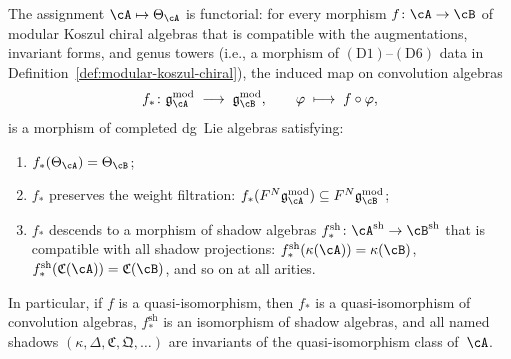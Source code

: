 \begin{proposition}
\label{prop:mc2-functoriality}
The assignment $\cA \mapsto \Theta_\cA$ is functorial:
for every morphism $f\colon \cA \to \cB$ of modular Koszul
chiral algebras that is compatible with the augmentations,
invariant forms, and genus towers
\textup{(}i.e., a morphism of
$(\mathrm{D1})$--$(\mathrm{D6})$ data in
Definition~\textup{\ref{def:modular-koszul-chiral})}, the
induced map on convolution algebras
\begin{equation}\label{eq:mc2-functoriality}
f_*\colon
\mathfrak{g}_\cA^{\mathrm{mod}}
\;\longrightarrow\;
\mathfrak{g}_\cB^{\mathrm{mod}},
\qquad
\varphi \;\longmapsto\; f \circ \varphi,
\end{equation}
is a morphism of completed dg~Lie algebras satisfying:
\begin{enumerate}[label=\textup{(\roman*)}]
\item $f_*(\Theta_\cA) = \Theta_\cB$;
\item $f_*$ preserves the weight filtration:
  $f_*(F^N\mathfrak{g}_\cA^{\mathrm{mod}})
  \subseteq F^N\mathfrak{g}_\cB^{\mathrm{mod}}$;
\item $f_*$ descends to a morphism of shadow algebras
  $f_*^{\mathrm{sh}}\colon \cA^{\mathrm{sh}} \to
  \cB^{\mathrm{sh}}$
  that is compatible with all shadow projections:
  $f_*^{\mathrm{sh}}(\kappa(\cA)) = \kappa(\cB)$,
  $f_*^{\mathrm{sh}}(\mathfrak{C}(\cA)) = \mathfrak{C}(\cB)$,
  and so on at all arities.
\end{enumerate}
In particular, if $f$ is a quasi-isomorphism, then
$f_*$ is a quasi-isomorphism of convolution algebras,
$f_*^{\mathrm{sh}}$ is an isomorphism of shadow algebras,
and all named shadows $(\kappa, \Delta, \mathfrak{C},
\mathfrak{Q}, \ldots)$ are invariants of the
quasi-isomorphism class of~$\cA$.
\end{proposition}

